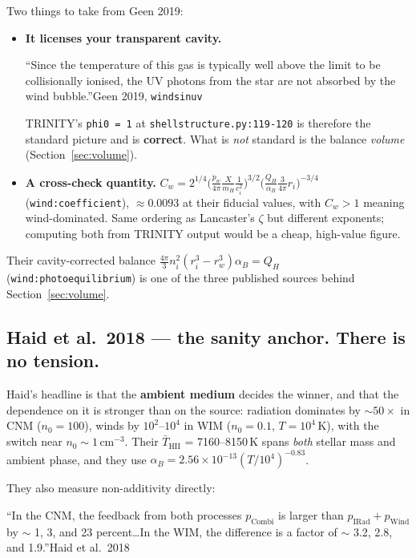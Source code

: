 \documentclass[11pt,a4paper,oneside]{report}
\newcommand{\brkus}{\textunderscore\allowbreak}
\newcommand{\code}[1]{\texttt{\small\let\_\brkus #1}}
\newcommand{\lbl}[1]{\texttt{\footnotesize\let\_\brkus #1}}
\newcommand{\pdotw}{\dot p}
\newcommand{\ci}{c_i}
\newcommand{\up}[1]{\textcolor{tqaccent}{\textbf{#1}}}
\begin{document}
Two things to take from Geen 2019:
\begin{itemize}
\item \textbf{It licenses your transparent cavity.}
      \begin{litquote}
      \small ``Since the temperature of this gas is typically well above the limit to be
      collisionally ionised, the UV photons from the star are not absorbed by the wind
      bubble.''\hfill{\scriptsize Geen 2019, \lbl{winds\_in\_uv}}
      \end{litquote}
      TRINITY's \code{phi0 = 1} at \code{shell\_structure.py:119-120} is therefore the
      standard picture and is \up{correct}. What is \emph{not} standard is the balance
      \emph{volume} (Section~\ref{sec:volume}).
\item \textbf{A cross-check quantity.}
      $C_w = 2^{1/4}\big(\frac{\pdotw_w}{4\pi}\frac{X}{m_H}\frac{1}{\ci^2}\big)^{3/2}
      \big(\frac{Q_H}{\alpha_B}\frac{3}{4\pi}r_i\big)^{-3/4}$ (\lbl{wind:coefficient}),
      ${\approx}0.0093$ at their fiducial values, with $C_w>1$ meaning wind-dominated. Same
      ordering as Lancaster's $\zeta$ but different exponents; computing both from TRINITY
      output would be a cheap, high-value figure.
\end{itemize}

Their cavity-corrected balance $\tfrac{4\pi}{3}n_i^2(r_i^3-r_w^3)\alpha_B=Q_H$
(\lbl{wind:photoequilibrium}) is one of the three published sources behind
Section~\ref{sec:volume}.

\subsection{Haid et al.\ 2018 --- the sanity anchor. There is no tension.}
\label{sec:haid}

Haid's headline is that the \up{ambient medium} decides the winner, and that the dependence
on it is stronger than on the source: radiation dominates by ${\sim}50\times$ in CNM
($n_0=100$), winds by $10^2$--$10^4$ in WIM ($n_0=0.1$, $T=10^4$\,K), with the switch near
$n_0\sim1\,$cm$^{-3}$. Their $\bar T_{\mathrm{HII}}$ = 7160--8150\,K spans \emph{both}
stellar mass and ambient phase, and they use
$\alpha_B = 2.56\times10^{-13}(T/10^4)^{-0.83}$.

They also measure non-additivity directly:

\begin{litquote}
\small ``In the CNM, the feedback from both processes $p_{\mathrm{Combi}}$ is larger than
$p_{\mathrm{IRad}}+p_{\mathrm{Wind}}$ by $\sim$ 1, 3, and 23 percent\ldots In the WIM, the
difference is a factor of $\sim$ 3.2, 2.8, and
1.9.''\hfill{\scriptsize Haid et al.\ 2018}
\end{litquote}
\end{document}
